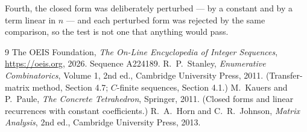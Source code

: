 \documentclass[11pt,a4paper]{article}
\theoremstyle{plain}
\theoremstyle{definition}
\begin{document}
Fourth, the closed form was deliberately perturbed --- by a constant and by a term linear in
$n$ --- and each perturbed form was rejected by the same comparison, so the test is not one
that anything would pass.

\begin{thebibliography}{9}
 The OEIS Foundation, \emph{The On-Line Encyclopedia of Integer
Sequences}, \url{https://oeis.org}, 2026. Sequence A224189.
 R.~P.~Stanley, \emph{Enumerative Combinatorics}, Volume 1, 2nd ed.,
Cambridge University Press, 2011. (Transfer-matrix method, Section 4.7; $C$-finite sequences,
Section 4.1.)
 M.~Kauers and P.~Paule, \emph{The Concrete Tetrahedron}, Springer, 2011.
(Closed forms and linear recurrences with constant coefficients.)
 R.~A.~Horn and C.~R.~Johnson, \emph{Matrix Analysis}, 2nd ed., Cambridge
University Press, 2013.
\end{thebibliography}
\end{document}
